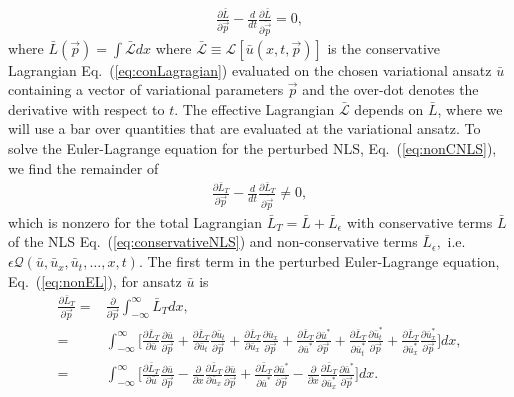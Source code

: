 \begin{align}
\frac{\partial \bar{L}}{\partial \vec{p}} - \frac{d}{dt} \frac{\partial \bar{L}}{\partial \dot{\vec{p}}} = 0,
\end{align}
where $\bar{L}(\vec{p}) = \int\bar{ \mathcal{L}} dx$ where $\bar{\mathcal{L}} \equiv \mathcal{L} [ \bar{u}(x,t,\vec{p})]$ is the conservative Lagrangian Eq.~(\ref{eq:conLagragian}) evaluated on the chosen variational ansatz $\bar{u}$ containing a vector of variational parameters $\vec{p}$ and the over-dot denotes the derivative with respect to $t$.  The effective Lagrangian $\bar{\mathcal{L}}$ depends on $\bar{L}$, where we will use a bar over quantities that are evaluated at the variational ansatz. 
To solve the Euler-Lagrange equation for the perturbed NLS, Eq.~(\ref{eq:nonCNLS}), we find the remainder of 
\begin{align}
 \frac{\partial \bar{L}_T}{\partial \vec{p}} - \frac{d}{dt} \frac{\partial \bar{L}_T}{\partial \dot{\vec{p}}} \ne 0,
 \label{eq:nonEL}
\end{align}
which is nonzero for the total Lagrangian $\bar{L}_T = \bar{L} + \bar{L}_{\epsilon}$ with conservative terms $\bar{L}$ of the NLS Eq.~(\ref{eq:conservativeNLS}) and non-conservative terms $\bar{L}_{\epsilon},$ i.e. $\epsilon \mathcal{Q}(\bar{u},\bar{u}_x, \bar{u}_t,\ldots,x,t)$.
The first term in the perturbed Euler-Lagrange equation, Eq.~(\ref{eq:nonEL}), for ansatz $\bar{u}$ is
\begin{align}
\frac{\partial \bar{L}_T}{\partial \vec{p}} =& \frac{\partial }{\partial \vec{p}} \int_{-\infty}^{\infty} \bar{L}_T dx, \nonumber \\
=& \int_{-\infty}^{\infty} \Bigg[ \frac{\partial \bar{L}_T}{\partial \bar{u}}\frac{\partial \bar{u}}{\partial \vec{p}}  + \frac{\partial \bar{L}_T}{\partial \bar{u}_t}\frac{\partial \bar{u}_t}{\partial \vec{p}} + \frac{\partial \bar{L}_T}{\partial \bar{u}_x}\frac{\partial \bar{u}_x}{\partial \vec{p}} + \frac{\partial \bar{L}_T}{\partial \bar{u}^*}\frac{\partial \bar{u}^*}{\partial \vec{p}}  + \frac{\partial \bar{L}_T}{\partial \bar{u}_t^*}\frac{\partial \bar{u}_t^*}{\partial \vec{p}} + \frac{\partial \bar{L}_T}{\partial \bar{u}_x^*}\frac{\partial \bar{u}_x^*}{\partial \vec{p}} \Bigg] dx, \nonumber \\
=& \int_{-\infty}^{\infty}  \Bigg[  \frac{\partial \bar{L}_T}{\partial \bar{u}} \frac{\partial \bar{u}}{\partial \vec{p}} - \frac{\partial}{\partial x} \frac{\partial \bar{L}_T}{\partial \bar{u}_x} \frac{\partial \bar{u}}{\partial \vec{p}}  + \frac{\partial \bar{L}_T}{\partial \bar{u}^*} \frac{\partial \bar{u}^*}{\partial \vec{p}} - \frac{\partial}{\partial x} \frac{\partial \bar{L}_T}{\partial \bar{u}_x^*} \frac{\partial \bar{u}^*}{\partial \vec{p}}  \Bigg] dx. \nonumber
\end{align}
